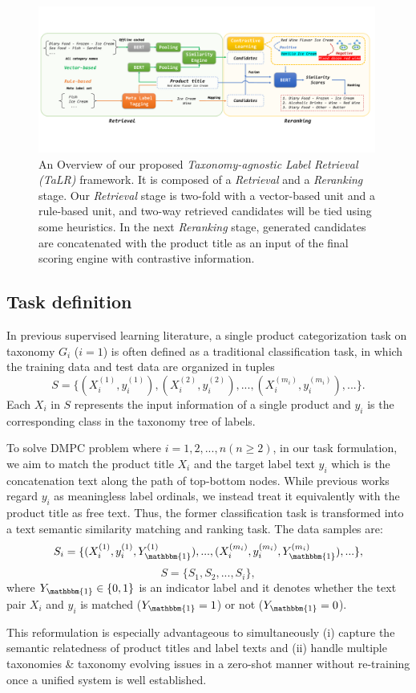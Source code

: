 \begin{figure}[thbp] \centering
    \includegraphics[width=0.99\textwidth]{pipeline5}
    \caption{An Overview of our proposed \textit{Taxonomy-agnostic Label Retrieval (TaLR)} framework. It is composed of a \textit{Retrieval} and a \textit{Reranking} stage. Our \textit{Retrieval} stage is two-fold with a vector-based unit and a rule-based unit, and two-way retrieved candidates will be tied using some heuristics. In the next \textit{Reranking} stage, generated candidates are concatenated with the product title as an input of the final scoring engine with contrastive information.} 
    \label{fig:pipeline}
\end{figure}

\subsection{Task definition}
In previous supervised learning literature, a single product categorization task on taxonomy $G_i$ ($i=1$) is often defined as a traditional classification task, in which the training data and test data are organized in tuples 
$$
S=\{(X_i^{(1)}, y_i^{(1)}), (X_i^{(2)}, y_i^{(2)}),...,(X_i^{(m_i)}, y_i^{(m_i)}),...\}.
$$
Each $X_i$ in $S$ represents the input information of a single product and $y_i$ is the corresponding class in the taxonomy tree of labels. 

To solve DMPC problem where $i=1,2,...,n (n \geq 2)$,
in our task formulation, 
we aim to match the product title $X_i$ and the target label text $y_i$ which is the concatenation text along the path of top-bottom nodes. While previous works regard $y_i$ as meaningless label ordinals, we instead treat it equivalently with the product title as free text. 
Thus, the former classification task is transformed into a text semantic similarity matching and ranking task. The data samples are:
$$
S_i=\{(X_i^{(1)}, y_i^{(1)}, Y_{\mathbbm{1}}^{(1)}),...,(X_i^{(m_i)}, y_i^{(m_i)}, Y_{\mathbbm{1}}^{(m_i)}),...\},
$$
$$
S=\{S_1, S_2,...,S_i\},
$$
where $Y_{\mathbbm{1}}\in \{0, 1\}$ is an indicator label and it denotes whether the text pair $X_i$ and $y_i$ is matched ($Y_{\mathbbm{1}}=1$) or not ($Y_{\mathbbm{1}}=0$).

This reformulation is especially advantageous to simultaneously (i) capture the semantic relatedness of product titles and label texts and (ii) handle multiple taxonomies \& taxonomy evolving issues in a zero-shot manner without re-training once a unified system is well established.
